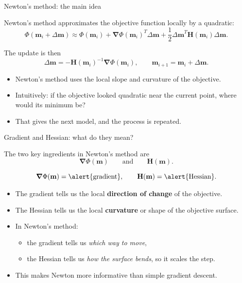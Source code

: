 \documentclass[aspectratio=169]{beamer}
\newcommand{\mat}[1]{{\mathbf{#1}}}
\renewcommand{\vec}[1]{\mathbf{#1}}
\newcommand{\mm}{ {\vec{m}} }
\newcommand{\delm}{ {\Delta\mm} }
\begin{document}
\begin{frame}{Newton's method: the main idea}
\small

Newton's method approximates the objective function locally by a quadratic:
\[
\Phi(\mm_i+\delm)
\approx
\Phi(\mm_i)
+
\bm{\nabla}\Phi(\mm_i)^T\delm
+
\frac{1}{2}\delm^T \mat{H}(\mm_i)\delm .
\]

The update is then
\[
\delm
=
-\mat{H}(\mm_i)^{-1}\bm{\nabla}\Phi(\mm_i),
\qquad
\mm_{i+1}=\mm_i+\delm.
\]

{
\vspace{0.15cm}
\begin{itemize}
    \item[--] Newton's method uses the local \alert{slope} and \alert{curvature} of the objective.
    \item[--] Intuitively: if the objective looked quadratic near the current point, where would its minimum be?
    \item[--] That gives the next model, and the process is repeated.
\end{itemize}
}
\end{frame}

\begin{frame}{Gradient and Hessian: what do they mean?}
\small

The two key ingredients in Newton's method are
\[
\bm{\nabla}\Phi(\mm)
\qquad \text{and} \qquad
\mat{H}(\mm).
\]

\[
\bm{\nabla}\Phi(\mm)
=
\text{\alert{gradient}},
\qquad
\mat{H}(\mm)
=
\text{\alert{Hessian}}.
\]

{
\vspace{0.15cm}
\begin{itemize}
    \item[--] The \alert{gradient} tells us the local \textbf{direction of change} of the objective.
    \item[--] The \alert{Hessian} tells us the local \textbf{curvature} or shape of the objective surface.
    \item[--] In Newton's method:
    \begin{itemize}
        \item[--] the gradient tells us \emph{which way to move},
        \item[--] the Hessian tells us \emph{how the surface bends}, so it scales the step.
    \end{itemize}
    \item[--] This makes Newton more informative than simple gradient descent.
\end{itemize}
}
\end{frame}
\end{document}
